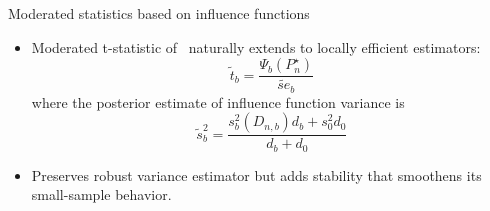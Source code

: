 \documentclass{beamer}
\begin{document}

\begin{frame}[c]{Moderated statistics based on influence functions}

\begin{center}
\begin{itemize}
  \itemsep12pt
  \item Moderated t-statistic of~\cite{smyth2004linear} naturally extends to
    locally efficient estimators:
    \begin{equation*}
      \tilde{t}_b = \frac{\Psi_b(P_n^{\star})}{\widetilde{se}_b}
    \end{equation*}
    where the posterior estimate of influence function variance is
    \begin{equation*}
      \tilde{s}^2_b = \frac{s^2_b(D_{n,b}) d_b + s^2_0 d_0}{d_b + d_0}
    \end{equation*}
  \item Preserves robust variance estimator but adds stability that smoothens
    its small-sample behavior.
\end{itemize}
\end{center}

\end{frame}

\end{document}
